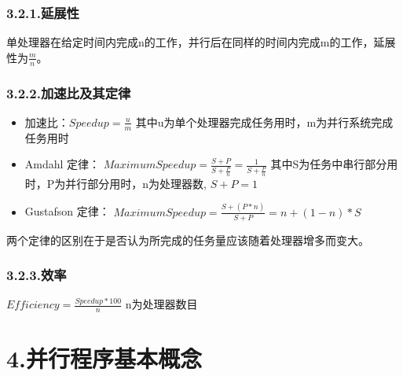 \documentclass{article}
\begin{document}
\subsubsection{3.2.1.\hspace*{0.5em}延展性}\label{section}%

\noindent{}单处理器在给定时间内完成n的工作，并行后在同样的时间内完成m的工作，延展性为$\frac{m}{n}$。%

\subsubsection{3.2.2.\hspace*{0.5em}加速比及其定律}\label{section}%

\begin{itemize}[noitemsep,topsep=\mdcompacttopsep]%

\item{}加速比：$Speedup = \frac{u}{m}$ 其中u为单个处理器完成任务用时，m为并行系统完成任务用时%

\item{}Amdahl 定律： $Maximum Speedup = \frac{S + P}{S + \frac{P}{n}} = \frac{1}{S + \frac{P}{n}}$ 其中S为任务中串行部分用时，P为并行部分用时，n为处理器数, $S + P = 1$%

\item{}Gustafson 定律： $Maximum Speedup = \frac{S + (P * n)}{S + P} = n + (1 - n) *S$%
\end{itemize}%

\noindent{}两个定律的区别在于是否认为所完成的任务量应该随着处理器增多而变大。%

\subsubsection{3.2.3.\hspace*{0.5em}效率}\label{section}%

\noindent{}$Efficiency = \frac{Speedup * 100}{n}$ n为处理器数目%

\section{4.\hspace*{0.5em}并行程序基本概念}\label{section}%
\end{document}
